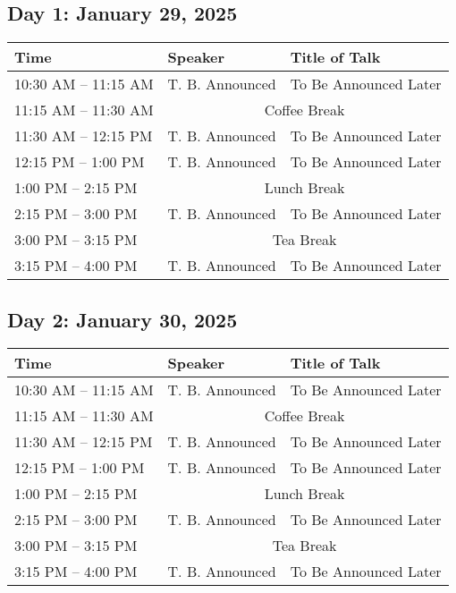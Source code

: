 %
%

\subsection*{Day 1: January 29, 2025}
\renewcommand{\arraystretch}{1.5}
\setlength{\tabcolsep}{12pt}

\noindent\begin{tabular}{|p{3.5cm}|p{4cm}|p{7cm}|}
\hline
\rowcolor{gray!20} \textbf{Time} & \textbf{Speaker} & \textbf{Title of Talk} \\
\hline
10:30 AM -- 11:15 AM & T. B. Announced & To Be Announced Later \\
\hline
\rowcolor{yellow!30} 11:15 AM -- 11:30 AM & \multicolumn{2}{|c|}{Coffee Break} \\
\hline
11:30 AM -- 12:15 PM & T. B. Announced & To Be Announced Later \\
\hline
12:15 PM -- 1:00 PM & T. B. Announced & To Be Announced Later \\
\hline
\rowcolor{yellow!30} 1:00 PM -- 2:15 PM & \multicolumn{2}{|c|}{Lunch Break} \\
\hline
2:15 PM -- 3:00 PM & T. B. Announced & To Be Announced Later \\
\hline
\rowcolor{yellow!30} 3:00 PM -- 3:15 PM & \multicolumn{2}{|c|}{Tea Break} \\
\hline
3:15 PM -- 4:00 PM & T. B. Announced & To Be Announced Later \\
\hline
\end{tabular}



\subsection*{Day 2: January 30, 2025}

\noindent\begin{tabular}{|p{3.5cm}|p{4cm}|p{7cm}|}
\hline
\rowcolor{gray!20} \textbf{Time} & \textbf{Speaker} & \textbf{Title of Talk} \\
\hline
10:30 AM -- 11:15 AM & T. B. Announced & To Be Announced Later \\
\hline
\rowcolor{yellow!30} 11:15 AM -- 11:30 AM & \multicolumn{2}{|c|}{Coffee Break} \\
\hline
11:30 AM -- 12:15 PM & T. B. Announced & To Be Announced Later \\
\hline
12:15 PM -- 1:00 PM & T. B. Announced & To Be Announced Later \\
\hline
\rowcolor{yellow!30} 1:00 PM -- 2:15 PM & \multicolumn{2}{|c|}{Lunch Break} \\
\hline
2:15 PM -- 3:00 PM & T. B. Announced & To Be Announced Later \\
\hline
\rowcolor{yellow!30} 3:00 PM -- 3:15 PM & \multicolumn{2}{|c|}{Tea Break} \\
\hline
3:15 PM -- 4:00 PM & T. B. Announced & To Be Announced Later \\
\hline
\end{tabular}


